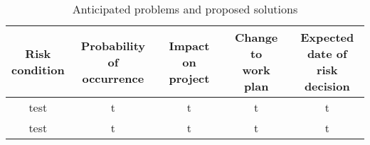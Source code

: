 \begin{table}
\caption{\label{tab:contingency}Anticipated problems and proposed solutions}
\begin{tabular}{c|c|c|c|c}

\parbox[t]{2cm}{Risk\\condition} & \parbox[t]{2.5cm}{Probability\\of occurrence} & \parbox[t]{3cm}{Impact on\\project} & \parbox[t]{3cm}{Change to\\work plan} & \parbox[t]{2.4cm}{Expected\\date of risk\\decision}\\[1.6cm]
\hline
test&t&t&t&t\\
test&t&t&t&t

\end{tabular}
\end{table}